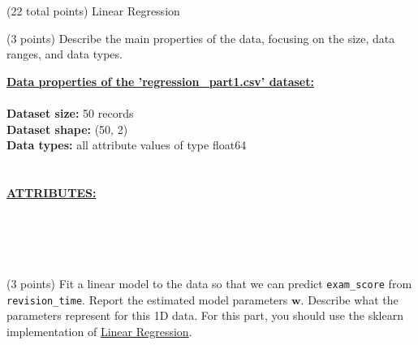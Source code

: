 \documentclass[12pt]{article}
\begin{document}
\begin{question}{(22 total points) Linear Regression}
\begin{subquestion}{(3 points) Describe the main properties of the data, focusing on the size, data ranges, and data types.   
}
\begin{answerbox}{30em}
\large{\textbf{\underline{Data properties of the 'regression\_part1.csv' dataset:}}}\\
\\
\normalsize{
\textbf{Dataset size:} 50 records\\
\textbf{Dataset shape:} (50, 2)\\
\textbf{Data types:} all attribute values of type float64\\
\\
\\
\textbf{\underline{ATTRIBUTES:}}}\\
\\
\\
\\
\\
\end{answerbox}



\end{subquestion}




%
%
\begin{subquestion}{(3 points) Fit a linear model to the data so that we can predict \texttt{exam\_score} from \texttt{revision\_time}. 
Report the estimated model parameters $\mathbf{w}$. 
Describe what the parameters represent for this 1D data. 
For this part, you should use the sklearn implementation of \href{https://scikit-learn.org/0.19/modules/generated/sklearn.linear_model.LinearRegression.html}{Linear Regression}.\\
}



\end{subquestion}
\end{question}
\end{document}
